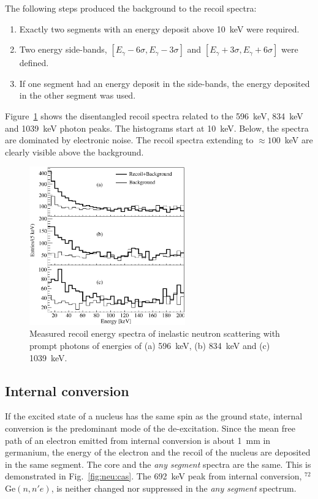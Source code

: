The following steps produced the background to the recoil spectra:
\begin{enumerate}
\item Exactly two segments with an energy deposit above 10~keV were
required.
\item Two energy side-bands, $[E_\gamma-6\sigma, E_\gamma-3\sigma]$
and $[E_\gamma+3\sigma, E_\gamma+6\sigma]$ were defined.
\item If one segment had an energy deposit in the side-bands, the
energy deposited in the other segment was used.
\end{enumerate}

Figure~\ref{fig:neu:recoil} shows the disentangled recoil spectra
related to the 596~keV, 834~keV and 1039~keV photon peaks. The
histograms start at 10~keV. Below, the spectra are dominated by
electronic noise. The recoil spectra extending to $\approx 100$~keV
are clearly visible above the background.

\begin{figure}[tbhp]
\centering
\includegraphics[width=0.6\textwidth]{recoil}
\caption{Measured recoil energy spectra of inelastic neutron
scattering with prompt photons of energies of (a) 596~keV, (b) 834~keV
and (c) 1039~keV.}
\label{fig:neu:recoil}
\end{figure}

\subsection{Internal conversion}
\label{sec:neu:conv}
If the excited state of a nucleus has the same spin as the ground
state, internal conversion \cite{Lis69, Kra56} is the predominant mode
of the de-excitation. Since the mean free path of an electron emitted
from internal conversion is about 1~mm in germanium, the energy of the
electron and the recoil of the nucleus are deposited in the same
segment. The core and the \emph{any segment} spectra are the
same. This is demonstrated in Fig.~\ref{fig:neu:cas}. The 692~keV peak
from internal conversion, $^{72}$Ge$(n,n'e)$, is neither changed nor
suppressed in the \emph{any segment} spectrum.

